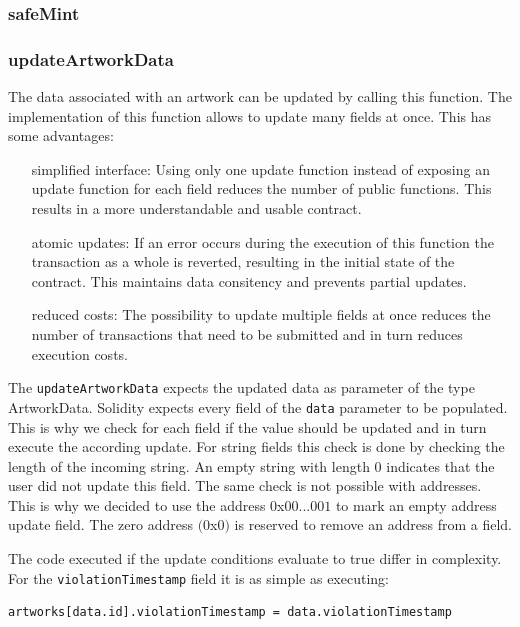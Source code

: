 \subsubsection{safeMint}

\subsubsection{updateArtworkData}
The data associated with an artwork can be updated by calling this function. The implementation of this function allows to update many fields at once. This has some advantages:
\begin{itemize}[align=left, font=\itshape]
    \item[simplified interface:] Using only one update function instead of exposing an update function for each field reduces the number of public functions. This results in a more understandable and usable contract.
    \item[atomic updates:] If an error occurs during the execution of this function the transaction as a whole is reverted, resulting in the initial state of the contract. This maintains data consitency and prevents partial updates.
    \item[reduced costs:] The possibility to update multiple fields at once reduces the number of transactions that need to be submitted and in turn reduces execution costs.
\end{itemize}



The \texttt{updateArtworkData} expects the updated data as parameter of the type ArtworkData. Solidity expects every field of the \texttt{data} parameter to be populated. This is why we check for each field if the value should be updated and in turn execute the according update. For string fields this check is done by checking the length of the incoming string. An empty string with length $0$ indicates that the user did not update this field. The same check is not possible with addresses. This is why we decided to use the address $0$x$00...001$ to mark an empty address update field. The zero address $(0$x$0)$ is reserved to remove an address from a field.

The code executed if the update conditions evaluate to true differ in complexity. For the \texttt{violationTimestamp} field it is as simple as executing: 
\begin{lstlisting}[language=Solidity]
    artworks[data.id].violationTimestamp = data.violationTimestamp
\end{lstlisting}

